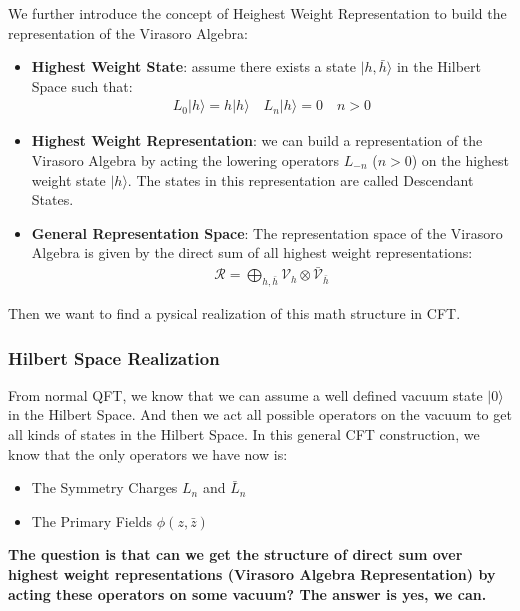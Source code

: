 We further introduce the concept of Heighest Weight Representation to
build the representation of the Virasoro Algebra:
\begin{itemize}
  \item \textbf{Highest Weight State}: assume there exists a state $
    |h,\bar{h}\rangle $ in the Hilbert Space such that:
    \begin{align}
      L_0|h\rangle=h|h\rangle \quad L_n|h\rangle=0\quad n>0
    \end{align}
  \item \textbf{Highest Weight Representation}: we can build a
    representation of the Virasoro Algebra by acting the lowering
    operators $ L_{-n} $ ($ n>0 $) on the highest weight state $
    |h\rangle $. The states in this representation are called Descendant States.
  \item \textbf{General Representation Space}: The representation
    space of the Virasoro Algebra is given by the direct sum of all
    highest weight representations:
    \begin{align}
      \mathcal{R}=\bigoplus_{h,\bar{h}}\mathcal{V}_{h}\otimes\bar{\mathcal{V}}_{\bar{h}}
    \end{align}
\end{itemize}
Then we want to find a pysical realization of this math structure in CFT.

\subsubsection{Hilbert Space Realization}

From normal QFT, we know that we can assume a well defined vacuum
state $ |0\rangle $ in the Hilbert Space. And then we act all
possible operators on the vacuum to get all kinds of states in the
Hilbert Space. In this general CFT construction, we know that the
only operators we have now is:
\begin{itemize}
  \item The Symmetry Charges $ L_n $ and $ \bar{L}_n $
  \item The Primary Fields $ \phi(z,\bar{z}) $
\end{itemize}
\textbf{
  The question is that can we get the structure of direct sum over
  highest weight representations (Virasoro Algebra Representation) by
  acting these operators on some vacuum? The answer is yes, we can.
}

